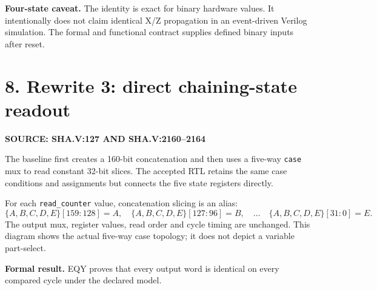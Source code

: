 \documentclass[10pt,a4paper]{article}
\newcommand{\smallcaps}[1]{\textcolor{Mid}{\fontsize{8.5}{10}\selectfont\bfseries\MakeUppercase{#1}}}
\newcommand{\newpageheading}[2]{\clearpage\section{#1}\smallcaps{#2}\vspace{6pt}}
\begin{document}
\begin{scopebox}\textbf{Four-state caveat.} The identity is exact for binary hardware values. It intentionally does not claim identical X/Z propagation in an event-driven Verilog simulation. The formal and functional contract supplies defined binary inputs after reset.\end{scopebox}

\newpageheading{8. Rewrite 3: direct chaining-state readout}{Source: sha.v:127 and sha.v:2160--2164}

The baseline first creates a 160-bit concatenation and then uses a five-way \texttt{case} mux to read constant 32-bit slices. The accepted RTL retains the same case conditions and assignments but connects the five state registers directly.

\begin{center}
\end{center}

For each \texttt{read\_counter} value, concatenation slicing is an alias:
\[
\{A,B,C,D,E\}[159{:}128]=A,\quad
\{A,B,C,D,E\}[127{:}96]=B,\quad\ldots\quad
\{A,B,C,D,E\}[31{:}0]=E.
\]
The output mux, register values, read order and cycle timing are unchanged. This diagram shows the actual five-way case topology; it does not depict a variable part-select.

\begin{claimbox}\textbf{Formal result.} EQY proves that every output word is identical on every compared cycle under the declared model.\end{claimbox}
\end{document}
